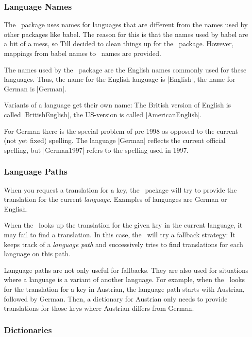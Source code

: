 \subsubsection{Language Names}

The \translatorname\ package uses names for languages that are different from the names used by other packages like babel. The reason for this is that the names used by babel are a bit of a mess, so Till decided to clean things up for the \translatorname\ package. However, mappings from babel names to \translatorname\ names are provided.

The names used by the \translatorname\ package are the English names commonly used for these languages. Thus, the name for the English language is |English|, the name for German is |German|.

Variants of a language get their own name: The British version of English is called |BritishEnglish|, the US-version is called |AmericanEnglish|.

For German there is the special problem of pre-1998 as opposed to the current (not yet fixed) spelling. The language |German| reflects the current official spelling, but |German1997| refers to the spelling used in 1997.

\subsubsection{Language Paths}

When you request a translation for a key, the \translatorname\ package will try to provide the translation for the current \emph{language}. Examples of languages are German or English.

When the \translatorname\ looks up the translation for the given key in the current language, it may fail to find a translation. In this case, the \translatorname\ will try a fallback strategy: It keeps track of a \emph{language path} and successively tries to find translations for each language on this path.

Language paths are not only useful for fallbacks. They are also used for situations where a language is a variant of another language. For example, when the \translatorname\ looks for the translation for a key in Austrian, the language path starts with Austrian, followed by German. Then, a dictionary for Austrian only needs to provide translations for those keys where Austrian differs from German. 

\subsubsection{Dictionaries}

